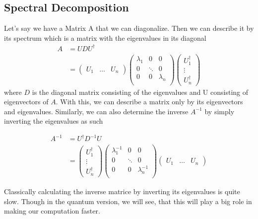 \subsection{Spectral Decomposition}
Let's say we have a Matrix A that we can diagonalize. 
Then we can describe it by its spectrum which is a matrix with the eigenvalues in its diagonal
\begin{equation} 
\begin{split}
A &=  U D U^{\dagger} \\
&= \begin{pmatrix} U_1 & \dots & U_n \end{pmatrix} \begin{pmatrix} \lambda_1 & 0 & 0 \\  0 & \ddots & 0\\ 0 & 0& \lambda_n \\ \end{pmatrix} \begin{pmatrix} U^\dagger_1 \\ \vdots \\ U^\dagger_n \end{pmatrix}
\end{split}
\end{equation}
where $D$ is the diagonal matrix consisting of the eigenvalues and U consisting of eigenvectors of $A$.
With this, we can describe a matrix only by its eigenvectors and eigenvalues. 
Similarly, we can also determine the inverse $A^{-1}$ by simply inverting the eigenvalues as such

\begin{equation}
\begin{split}
 A^{-1} 
 &=  U^{\dagger} D^{-1} U\\
 &= \begin{pmatrix} U^\dagger_1 \\ \vdots \\ U^\dagger_n \end{pmatrix}
\begin{pmatrix} \lambda_1^{-1} & 0 & 0\\ 0 & \ddots & 0\\ 0 & 0& \lambda_n^{-1} \\ \end{pmatrix}
\begin{pmatrix} U_1 & \dots & U_n \end{pmatrix} 
\end{split}
\end{equation}


Classically calculating the inverse matrice by inverting its eigenvalues is quite slow. 
Though in the quantum version, we will see, that this will play a big role in making our computation faster.

